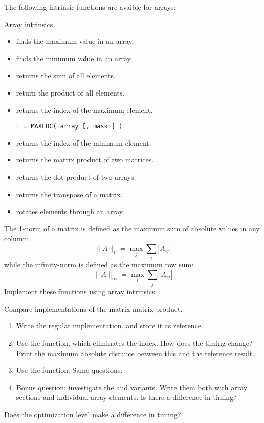 The following intrinsic functions are avaible for arrays:
\begin{block}{Array intrinsics}
  \label{sl:array-funcf}
  \begin{itemize}
  \item {} finds the maximum value in an array.
  \item {} finds the minimum value in an array.
  \item {} returns the sum of all elements.
  \item {} return the product of all elements.
  \item {} returns the index of the maximum
    element.
\begin{verbatim}
i = MAXLOC( array [, mask ] )
\end{verbatim}
  \item {} returns the index of the minimum element.
  \item {} returns the matrix product of two matrices.
  \item {} returns the dot product of two
    arrays.
  \item {} returns the transpose of a matrix.
  \item {} rotates elements through an array.
  \end{itemize}
\end{block}

\begin{exercise}
  \label{ex:fmatnorm}
  The 1-norm of a matrix is defined as the maximum sum of absolute
  values in any column:
  \[ \|A\|_1 = \max_j \sum_i |A_{ij}| \]
  while the infinity-norm is defined as the maximum row sum:
  \[ \|A\|_\infty = \max_i \sum_j |A_{ij}| \]
  Implement these functions using array intrinsics.
\end{exercise}

\begin{exercise}
  \label{ex:fmatmul}
  Compare implementations of the matrix-matrix product.
  \begin{enumerate}
  \item Write the regular  implementation, and store it as
    reference.
  \item Use the  function, which eliminates the 
    index. How does the timing change? Print the maximum absolute
    distance between this and the reference result.
  \item Use the  function. Same questions.
  \item Bonus question: investigate the  and 
    variants. Write them both with array sections and individual array
    elements. Is there a difference in timing?
  \end{enumerate}
  Does the optimization level make a difference in timing?
\end{exercise}

